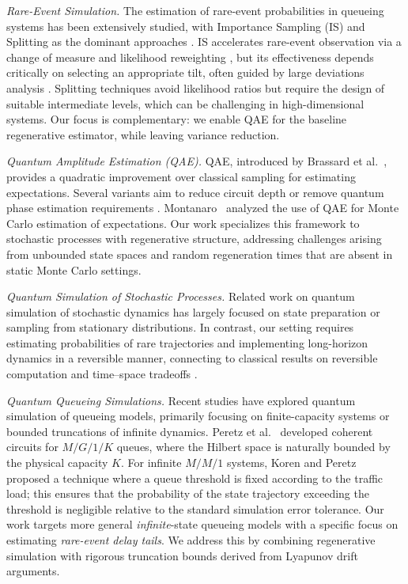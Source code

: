 \documentclass[11pt]{article}
\begin{document}
\textit{Rare-Event Simulation.}
The estimation of rare-event probabilities in queueing systems has been extensively studied, with Importance Sampling (IS) and Splitting as the dominant approaches \cite{AsmussenGlynn2007}. IS accelerates rare-event observation via a change of measure and likelihood reweighting \cite{asmussen2007applied, glynn1994simulation}, but its effectiveness depends critically on selecting an appropriate tilt, often guided by large deviations analysis \cite{siegmund1976importance}. Splitting techniques \cite{villen2002restart} avoid likelihood ratios but require the design of suitable intermediate levels, which can be challenging in high-dimensional systems. Our focus is complementary: we enable QAE for the baseline regenerative estimator, while leaving variance reduction.

\textit{Quantum Amplitude Estimation (QAE).}
QAE, introduced by Brassard et al.~\cite{brassard2002quantum}, provides a quadratic improvement over classical sampling for estimating expectations. Several variants aim to reduce circuit depth or remove quantum phase estimation requirements \cite{suzuki2020amplitude, grinko2019iterative}. Montanaro~\cite{montanaro2015quantum} analyzed the use of QAE for Monte Carlo estimation of expectations. Our work specializes this framework to stochastic processes with regenerative structure, addressing challenges arising from unbounded state spaces and random regeneration times that are absent in static Monte Carlo settings.

\textit{Quantum Simulation of Stochastic Processes.}
Related work on quantum simulation of stochastic dynamics has largely focused on state preparation or sampling from stationary distributions. In contrast, our setting requires estimating probabilities of rare trajectories and implementing long-horizon dynamics in a reversible manner, connecting to classical results on reversible computation and time--space tradeoffs \cite{bennett1973, bennett1989}.

\textit{Quantum Queueing Simulations.}
Recent studies have explored quantum simulation of queueing models, primarily focusing on finite-capacity systems or bounded truncations of infinite dynamics. Peretz et al.~\cite{peretz2025quantum} developed coherent circuits for $M/G/1/K$ queues, where the Hilbert space is naturally bounded by the physical capacity $K$. For infinite $M/M/1$ systems, Koren and Peretz~\cite{koren2024dynamic} proposed a  technique where a queue threshold is fixed according to the traffic load; this ensures that the probability of the state trajectory exceeding the threshold is negligible relative to the standard simulation error tolerance. Our work targets more general \emph{infinite}-state queueing models with a specific focus on estimating \emph{rare-event delay tails}. We address this by combining regenerative simulation with rigorous truncation bounds derived from Lyapunov drift arguments.
\end{document}
